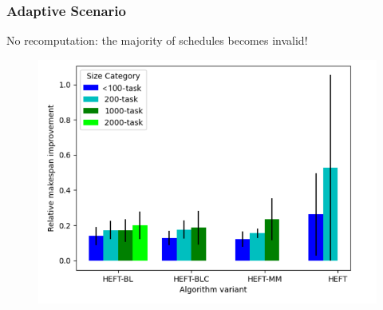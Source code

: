 \documentclass[xcolor=svgnames,titlepage,english,presentation]{beamer}
\begin{document}
\begin{frame}
    \frametitle{Adaptive Scenario}

    No recomputation: the majority of schedules becomes invalid!
   
      
        \begin{figure}
            \centering
            \includegraphics[scale=0.3]{diagrams/images/MsImprovDynamicCCGRID.png}
          
        \end{figure}
   
\end{frame}
\end{document}
